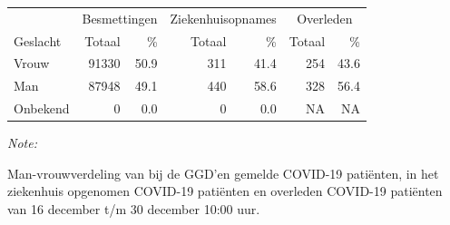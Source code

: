 \documentclass[
  english,
  man,floatsintext]{apa6}
\begin{document}
\begin{table}
\centering\begingroup\fontsize{11}{13}\selectfont

\begin{threeparttable}
\begin{tabular}{lrrrrrr}
\toprule
\multicolumn{1}{c}{ } & \multicolumn{2}{c}{Besmettingen} & \multicolumn{2}{c}{Ziekenhuisopnames} & \multicolumn{2}{c}{Overleden} \\
\cmidrule(l{3pt}r{3pt}){2-3} \cmidrule(l{3pt}r{3pt}){4-5} \cmidrule(l{3pt}r{3pt}){6-7}
Geslacht & Totaal & \% & Totaal & \% & Totaal & \%\\
\midrule
Vrouw & 91330 & 50.9 & 311 & 41.4 & 254 & 43.6\\
Man & 87948 & 49.1 & 440 & 58.6 & 328 & 56.4\\
Onbekend & 0 & 0.0 & 0 & 0.0 & NA & NA\\
\bottomrule
\end{tabular}
\begin{tablenotes}
\item \textit{Note: } 
\item Man-vrouwverdeling van bij de GGD’en gemelde COVID-19 patiënten, in het ziekenhuis opgenomen COVID-19 patiënten en overleden COVID-19 patiënten van 16 december t/m 30 december 10:00 uur.
\end{tablenotes}
\end{threeparttable}
\endgroup{}
\end{table}
\newpage
\end{document}
